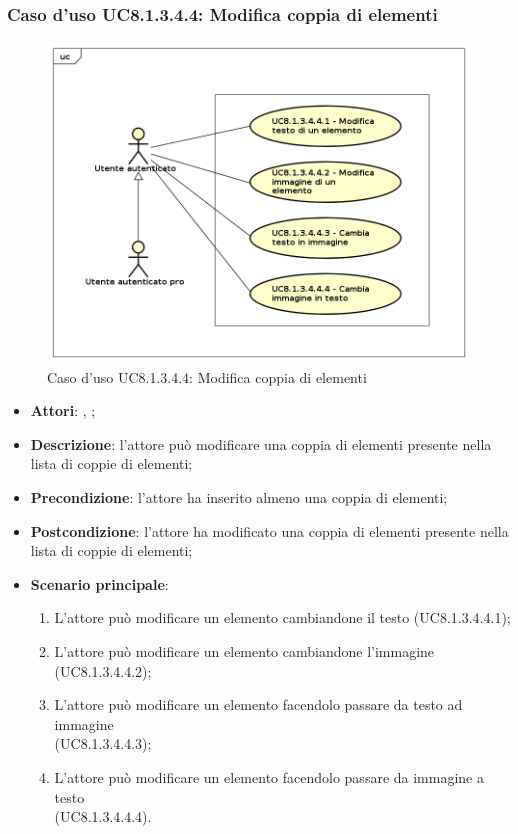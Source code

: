 	\subsubsection{Caso d'uso UC8.1.3.4.4: Modifica coppia di elementi}
	\label{UC8.1.3.4.4}
	\begin{figure}[h]
		\centering
		\includegraphics[scale=0.5,keepaspectratio]{UML/UC8_1_3_4_4.png}
		\caption{Caso d'uso UC8.1.3.4.4: Modifica coppia di elementi}
	\end{figure}
	\FloatBarrier
	\begin{itemize}
		\item \textbf{Attori}: \uau, \uaupro;
		\item \textbf{Descrizione}: l'attore può modificare una coppia di elementi presente nella lista di coppie di elementi;
		\item \textbf{Precondizione}: l'attore ha inserito almeno una coppia di elementi;
		\item \textbf{Postcondizione}: l'attore ha modificato una coppia di elementi presente nella lista di coppie di elementi; 
		\item \textbf{Scenario principale}: 
		\begin{enumerate}
			\item L'attore può modificare un elemento cambiandone il testo (UC8.1.3.4.4.1);
			\item L'attore può modificare un elemento cambiandone l'immagine (UC8.1.3.4.4.2);
			\item L'attore può modificare un elemento facendolo passare da testo ad immagine \\(UC8.1.3.4.4.3);
			\item L'attore può modificare un elemento facendolo passare da immagine a testo \\(UC8.1.3.4.4.4).	
		\end{enumerate}
	\end{itemize}
	

